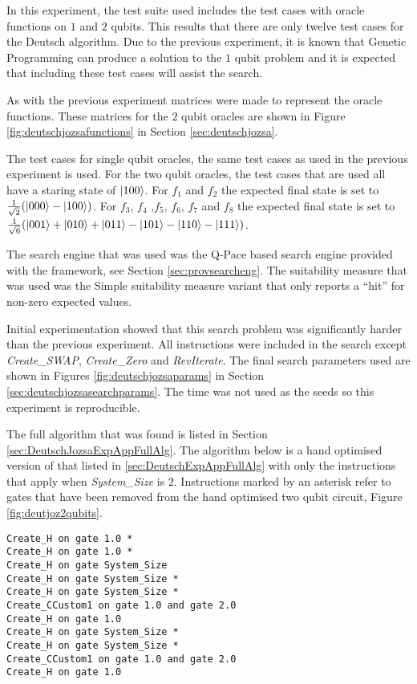 In this experiment, the test suite used includes the test cases with oracle functions on $1$ and $2$ qubits.
This results that there are only twelve test cases for the Deutsch algorithm.
Due to the previous experiment, it is known that Genetic Programming can produce a solution to the $1$ qubit problem and it is expected that including these test cases will assist the search.

As with the previous experiment matrices were made to represent the oracle functions.
These matrices for the $2$ qubit oracles are shown in Figure \ref{fig:deutschjozsafunctions} in Section \ref{sec:deutschjozsa}.

The test cases for single qubit oracles, the same test cases as used in the previous experiment is used.
For the two qubit oracles, the test cases that are used all have a staring state of $\left\vert{100}\right\rangle$.
For $f_1$ and $f_2$ the expected final state is set to $\frac{1}{\sqrt{2}}(\left\vert{000}\right\rangle-\left\vert{100}\right\rangle)$.
For $f_3$, $f_4$ ,$f_5$, $f_6$, $f_7$ and $f_8$ the expected final state is set to $\frac{1}{\sqrt{6}}(\left\vert{001}\right\rangle+\left\vert{010}\right\rangle+\left\vert{011}\right\rangle-\left\vert{101}\right\rangle-\left\vert{110}\right\rangle-\left\vert{111}\right\rangle)$.

The search engine that was used was the Q-Pace based search engine provided with the framework, see Section \ref{sec:provsearcheng}.
The suitability measure that was used was the Simple suitability measure variant that only reports a ``hit'' for non-zero expected values.

Initial experimentation showed that this search problem was significantly harder than the previous experiment.
All instructions were included in the search except \emph{Create\_SWAP}, \emph{Create\_Zero} and \emph{RevIterate}.
The final search parameters used are shown in Figures \ref{fig:deutschjozsaparams} in Section \ref{sec:deutschjozsasearchparams}.
The time was not used as the seeds so this experiment is reproducible.

The full algorithm that was found is listed in Section \ref{sec:DeutschJozsaExpAppFullAlg}.
The algorithm below is a hand optimised version of that listed in \ref{sec:DeutschExpAppFullAlg} with only the instructions that apply when \emph{System\_Size} is $2$.
Instructions marked by an asterisk refer to gates that have been removed from the hand optimised two qubit circuit, Figure \ref{fig:deutjoz2qubits}.

\lstset{numbers=left,language=Java, breaklines=true}
\begin{lstlisting}
Create_H on gate 1.0 *
Create_H on gate 1.0 *
Create_H on gate System_Size
Create_H on gate System_Size *
Create_H on gate System_Size *
Create_CCustom1 on gate 1.0 and gate 2.0
Create_H on gate 1.0
Create_H on gate System_Size *
Create_H on gate System_Size *
Create_CCustom1 on gate 1.0 and gate 2.0
Create_H on gate 1.0
\end{lstlisting}

